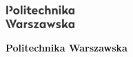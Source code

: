 \documentclass[\main/boa.tex]{subfiles}
\begin{document}
	\begin{minipage}[t]{0.915\textwidth}
		\center     
		\includegraphics[width=100px]{img/logos.bw/pw.png} 
	\end{minipage}

\Large \textbf {Politechnika Warszawska}


\vskip 0.3cm
\normalsize 
\end{document}
